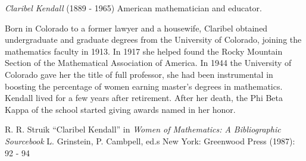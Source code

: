 \documentclass[12pt]{article}
\begin{document}
\emph{Claribel Kendall} (1889 - 1965) American mathematician and educator.

Born in Colorado to a former lawyer and a housewife, Claribel obtained undergraduate and graduate degrees from the University of Colorado, joining the mathematics faculty in 1913. In 1917 she helped found the Rocky Mountain Section of the Mathematical Association of America. In 1944 the University of Colorado gave her the title of full professor, she had been instrumental in boosting the percentage of women earning master's degrees in mathematics. Kendall lived for a few years after retirement. After her death, the Phi Beta Kappa of the school started giving awards named in her honor.

\begin{thebibliography}{1}
 R. R. Struik ``Claribel Kendall'' in {\it Women of Mathematics: A Bibliographic Sourcebook} L. Grinstein, P. Cambpell, ed.s New York: Greenwood Press (1987): 92 - 94
\end{thebibliography}
\end{document}
